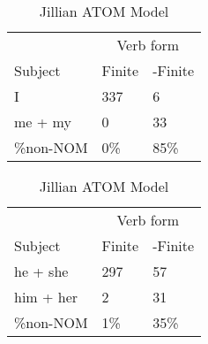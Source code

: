 \begin{table}[]
\caption{Jillian ATOM Model}
\begin{minipage}{0.5\textwidth}
    \centering
    \begin{tabular}{@{}lll@{}}
        \toprule
         & \multicolumn{2}{c}{Verb form}\\
         \cline{2-3}
        Subject & Finite & -Finite \\
        \midrule
        I & 337 & 6 \\
        me + my & 0 & 33 \\
        \hline
        \%non-NOM & 0\% & 85\% \\
        \bottomrule
    \end{tabular}
\end{minipage}
\begin{minipage}{0.5\textwidth}
    \centering
    \begin{tabular}{@{}lll@{}}
        \toprule
         & \multicolumn{2}{c}{Verb form}\\
         \cline{2-3}
        Subject & Finite & -Finite \\
        \midrule
        he + she & 297 & 57 \\
        him + her & 2 & 31 \\
        \hline
        \%non-NOM & 1\% & 35\% \\
        \bottomrule
    \end{tabular}
    \end{minipage}


\end{table}
